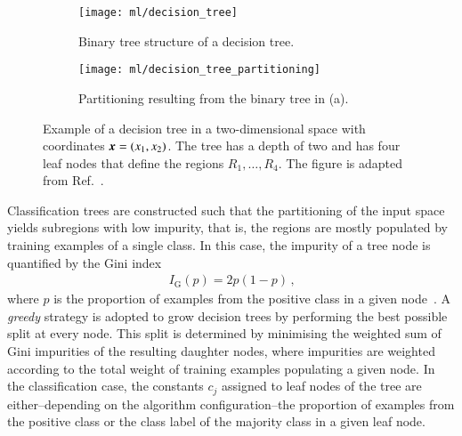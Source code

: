 \begin{figure}[htbp]
  \centering

  \begin{subfigure}[b]{0.46\textwidth}
    \centering
    \texttt{[image: ml/decision\_tree]}
    \caption{Binary tree structure of a decision tree.}
  \end{subfigure}\hfill%
  \begin{subfigure}[b]{0.46\textwidth}
    \centering
    \texttt{[image: ml/decision\_tree\_partitioning]}
    \vspace*{0.7em}
    \caption{Partitioning resulting from the binary tree in (a).}
  \end{subfigure}\hfill%

  \caption{Example of a decision tree in a two-dimensional space with
    coordinates $\myvec{x} = (x_1, x_2)$. The tree has a depth of two and has
    four leaf nodes that define the regions $R_1, \dots, R_4$. The figure is
    adapted from Ref.~\cite{hastie09}.}%
  \label{fig:decision_tree}
\end{figure}

Classification trees are constructed such that the partitioning of the input
space yields subregions with low impurity, that is, the regions are mostly
populated by training examples of a single class. In this case, the impurity of
a tree node is quantified by the Gini index
\begin{align*}
  I_{\text{G}}(p) = 2 p (1 - p) \,\text{,}
\end{align*}
where $p$ is the proportion of examples from the positive class in a given
node~\cite{hastie09}. A \emph{greedy} strategy is adopted to grow decision trees
by performing the best possible split at every node. This split is determined by
minimising the weighted sum of Gini impurities of the resulting daughter nodes,
where impurities are weighted according to the total weight of training examples
populating a given node. In the classification case, the constants $c_j$
assigned to leaf nodes of the tree are either--depending on the algorithm
configuration--the proportion of examples from the positive class or the class
label of the majority class in a given leaf node.

